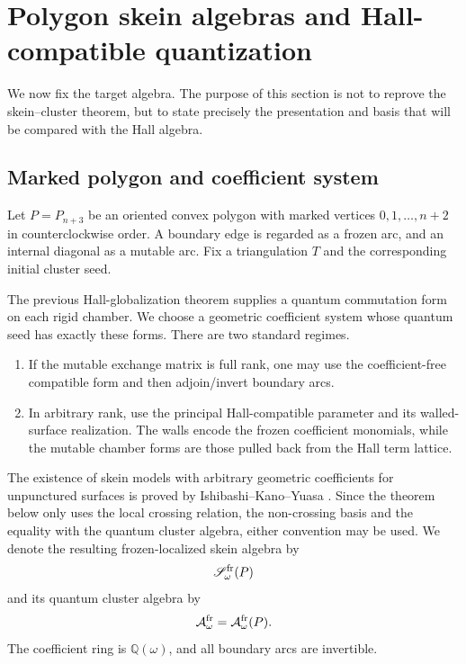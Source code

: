 \section{Polygon skein algebras and Hall-compatible quantization}
\label{sec:skein}

We now fix the target algebra.  The purpose of this section is not to reprove
the skein--cluster theorem, but to state precisely the presentation and basis
that will be compared with the Hall algebra.

\subsection{Marked polygon and coefficient system}

Let $P=P_{n+3}$ be an oriented convex polygon with marked vertices
$0,1,\ldots,n+2$ in counterclockwise order.  A boundary edge is regarded as a
frozen arc, and an internal diagonal as a mutable arc.  Fix a triangulation
$T$ and the corresponding initial cluster seed.

The previous Hall-globalization theorem supplies a quantum commutation form on
each rigid chamber.  We choose a geometric coefficient system whose quantum
seed has exactly these forms.  There are two standard regimes.

\begin{enumerate}[label=(\roman*),leftmargin=2.3em]
\item If the mutable exchange matrix is full rank, one may use the
      coefficient-free compatible form and then adjoin/invert boundary arcs.
\item In arbitrary rank, use the principal Hall-compatible parameter and its
      walled-surface realization.  The walls encode the frozen coefficient
      monomials, while the mutable chamber forms are those pulled back from the
      Hall term lattice.
\end{enumerate}

The existence of skein models with arbitrary geometric coefficients for
unpunctured surfaces is proved by Ishibashi--Kano--Yuasa
\cite{IshibashiKanoYuasa}.  Since the theorem below only uses the local
crossing relation, the non-crossing basis and the equality with the quantum
cluster algebra, either convention may be used.  We denote the resulting
frozen-localized skein algebra by
\[
 \mathscr S_\omega^{\rm fr}(P)
\]
and its quantum cluster algebra by
\[
 \mathcal A_{\omega}^{\mathrm{fr}}=\mathcal A_\omega^{\rm fr}(P).
\]
The coefficient ring is $\mathbb Q(\omega)$, and all boundary arcs are
invertible.

